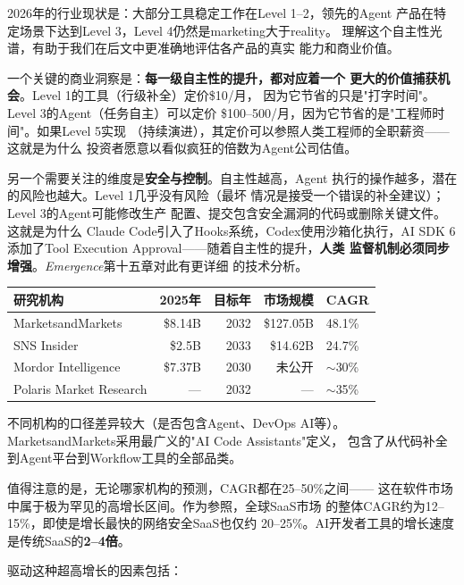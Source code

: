 2026年的行业现状是：大部分工具稳定工作在Level 1--2，领先的Agent
产品在特定场景下达到Level 3，Level 4仍然是marketing大于reality。
理解这个自主性光谱，有助于我们在后文中更准确地评估各产品的真实
能力和商业价值。

一个关键的商业洞察是：\textbf{每一级自主性的提升，都对应着一个
更大的价值捕获机会}。Level 1的工具（行级补全）定价\$10/月，
因为它节省的只是"打字时间"。Level 3的Agent（任务自主）可以定价
\$100--500/月，因为它节省的是"工程师时间"。如果Level 5实现
（持续演进），其定价可以参照人类工程师的全职薪资——这就是为什么
投资者愿意以看似疯狂的倍数为Agent公司估值。

另一个需要关注的维度是\textbf{安全与控制}。自主性越高，Agent
执行的操作越多，潜在的风险也越大。Level 1几乎没有风险（最坏
情况是接受一个错误的补全建议）；Level 3的Agent可能修改生产
配置、提交包含安全漏洞的代码或删除关键文件。这就是为什么
Claude Code引入了Hooks系统，Codex使用沙箱化执行，AI SDK 6
添加了Tool Execution Approval——随着自主性的提升，\textbf{人类
监督机制必须同步增强}。\textit{Emergence}第十五章对此有更详细
的技术分析。

\begin{keybox}[AI 开发者工具市场规模预测]
\small
\begin{tabularx}{\textwidth}{l r r r X}
\toprule
\rowcolor{figLightGray}
\textbf{研究机构} & \textbf{2025年} & \textbf{目标年}
  & \textbf{市场规模} & \textbf{CAGR} \\
\midrule
MarketsandMarkets  & \$8.14B  & 2032  & \$127.05B  & 48.1\% \\
SNS Insider        & \$2.5B   & 2033  & \$14.62B   & 24.7\% \\
Mordor Intelligence & \$7.37B & 2030  & 未公开      & $\sim$30\% \\
Polaris Market Research & ---  & 2032  & ---         & $\sim$35\% \\
\bottomrule
\end{tabularx}

\medskip
\noindent 不同机构的口径差异较大（是否包含Agent、DevOps AI等）。
MarketsandMarkets采用最广义的"AI Code Assistants"定义，
包含了从代码补全到Agent平台到Workflow工具的全部品类。
\end{keybox}

值得注意的是，无论哪家机构的预测，CAGR都在25--50\%之间——
这在软件市场中属于极为罕见的高增长区间。作为参照，全球SaaS市场
的整体CAGR约为12--15\%，即使是增长最快的网络安全SaaS也仅约
20--25\%。AI开发者工具的增长速度是传统SaaS的\textbf{2--4倍}。

驱动这种超高增长的因素包括：

